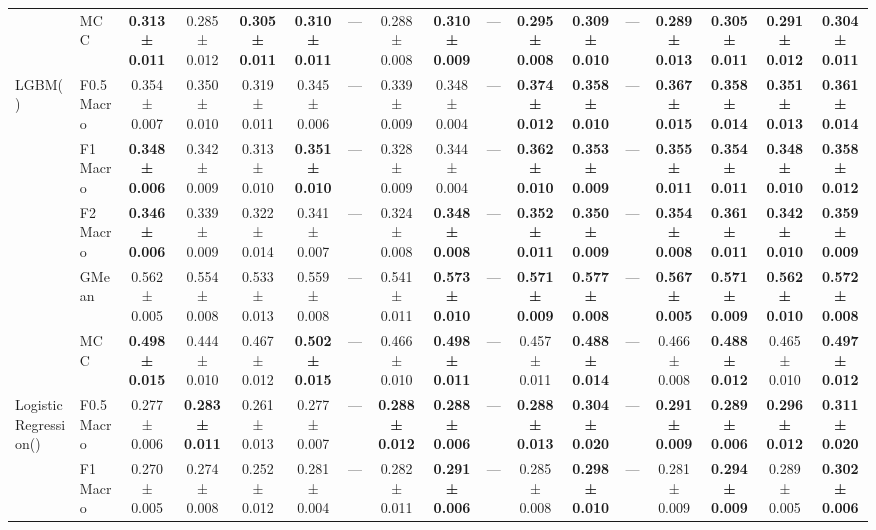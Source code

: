 \begin{table}[H]
{\begin{tabular}{llccccccccccccccc}
 & MCC & \textbf{0.313 ± 0.011} & 0.285 ± 0.012 & \textbf{0.305 ± 0.011} & \textbf{0.310 ± 0.011} & — & 0.288 ± 0.008 & \textbf{0.310 ± 0.009} & — & \textbf{0.295 ± 0.008} & \textbf{0.309 ± 0.010} & — & \textbf{0.289 ± 0.013} & \textbf{0.305 ± 0.011} & \textbf{0.291 ± 0.012} & \textbf{0.304 ± 0.011} \\
\cline{1-17}
\multirow[t]{5}{*}{LGBM()} & F0.5 Macro & 0.354 ± 0.007 & 0.350 ± 0.010 & 0.319 ± 0.011 & 0.345 ± 0.006 & — & 0.339 ± 0.009 & 0.348 ± 0.004 & — & \textbf{0.374 ± 0.012} & \textbf{0.358 ± 0.010} & — & \textbf{0.367 ± 0.015} & \textbf{0.358 ± 0.014} & \textbf{0.351 ± 0.013} & \textbf{0.361 ± 0.014} \\
 & F1 Macro & \textbf{0.348 ± 0.006} & 0.342 ± 0.009 & 0.313 ± 0.010 & \textbf{0.351 ± 0.010} & — & 0.328 ± 0.009 & 0.344 ± 0.004 & — & \textbf{0.362 ± 0.010} & \textbf{0.353 ± 0.009} & — & \textbf{0.355 ± 0.011} & \textbf{0.354 ± 0.011} & \textbf{0.348 ± 0.010} & \textbf{0.358 ± 0.012} \\
 & F2 Macro & \textbf{0.346 ± 0.006} & 0.339 ± 0.009 & 0.322 ± 0.014 & 0.341 ± 0.007 & — & 0.324 ± 0.008 & \textbf{0.348 ± 0.008} & — & \textbf{0.352 ± 0.011} & \textbf{0.350 ± 0.009} & — & \textbf{0.354 ± 0.008} & \textbf{0.361 ± 0.011} & \textbf{0.342 ± 0.010} & \textbf{0.359 ± 0.009} \\
 & GMean & 0.562 ± 0.005 & 0.554 ± 0.008 & 0.533 ± 0.013 & 0.559 ± 0.008 & — & 0.541 ± 0.011 & \textbf{0.573 ± 0.010} & — & \textbf{0.571 ± 0.009} & \textbf{0.577 ± 0.008} & — & \textbf{0.567 ± 0.005} & \textbf{0.571 ± 0.009} & \textbf{0.562 ± 0.010} & \textbf{0.572 ± 0.008} \\
 & MCC & \textbf{0.498 ± 0.015} & 0.444 ± 0.010 & 0.467 ± 0.012 & \textbf{0.502 ± 0.015} & — & 0.466 ± 0.010 & \textbf{0.498 ± 0.011} & — & 0.457 ± 0.011 & \textbf{0.488 ± 0.014} & — & 0.466 ± 0.008 & \textbf{0.488 ± 0.012} & 0.465 ± 0.010 & \textbf{0.497 ± 0.012} \\
\cline{1-17}
\multirow[t]{5}{*}{LogisticRegression()} & F0.5 Macro & 0.277 ± 0.006 & \textbf{0.283 ± 0.011} & 0.261 ± 0.013 & 0.277 ± 0.007 & — & \textbf{0.288 ± 0.012} & \textbf{0.288 ± 0.006} & — & \textbf{0.288 ± 0.013} & \textbf{0.304 ± 0.020} & — & \textbf{0.291 ± 0.009} & \textbf{0.289 ± 0.006} & \textbf{0.296 ± 0.012} & \textbf{0.311 ± 0.020} \\
 & F1 Macro & 0.270 ± 0.005 & 0.274 ± 0.008 & 0.252 ± 0.012 & 0.281 ± 0.004 & — & 0.282 ± 0.011 & \textbf{0.291 ± 0.006} & — & 0.285 ± 0.008 & \textbf{0.298 ± 0.010} & — & 0.281 ± 0.009 & \textbf{0.294 ± 0.009} & 0.289 ± 0.005 & \textbf{0.302 ± 0.006} \\

\end{tabular}}
\end{table}
